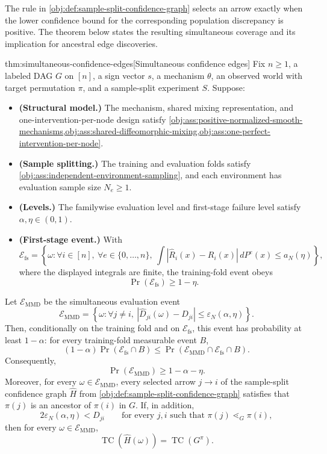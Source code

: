\documentclass[11pt]{article}
\begin{document}
The rule in \cref{obj:def:sample-split-confidence-graph} selects an arrow exactly when the lower confidence bound for the corresponding population discrepancy is positive. The theorem below states the resulting simultaneous coverage and its implication for ancestral edge discoveries.

\begin{theoremv}{thm:simultaneous-confidence-edges}[Simultaneous confidence edges]
Fix \(n\ge 1\), a labeled DAG \(G\) on \([n]\), a sign vector \(s\), a mechanism \(\theta\), an observed world with target permutation \(\pi\), and a sample-split experiment \(S\). Suppose:
\begin{itemize}
\item \textbf{(Structural model.)} The mechanism, shared mixing representation, and one-intervention-per-node design satisfy \cref{obj:ass:positive-normalized-smooth-mechanisms,obj:ass:shared-diffeomorphic-mixing,obj:ass:one-perfect-intervention-per-node}.
\item \textbf{(Sample splitting.)} The training and evaluation folds satisfy \cref{obj:ass:independent-environment-sampling}, and each environment has evaluation sample size \(N_e\ge 1\).
\item \textbf{(Levels.)} The familywise evaluation level and first-stage failure level satisfy \(\alpha,\eta\in(0,1)\).
\item \textbf{(First-stage event.)} With
\[
\mathcal E_{\mathrm{fs}}
=
\left\{
\omega:
\forall i\in[n],\ \forall e\in\{0,\ldots,n\},\
\int
\left|\widehat R_i(x)-R_i(x)\right|
\,dP^e(x)
\le a_N(\eta)
\right\},
\]
where the displayed integrals are finite, the training-fold event obeys
\[
\Pr(\mathcal E_{\mathrm{fs}})\ge 1-\eta .
\]
\end{itemize}
Let \(\mathcal E_{\mathrm{MMD}}\) be the simultaneous evaluation event
\[
\mathcal E_{\mathrm{MMD}}
=
\left\{
\omega:
\forall j\ne i,\
\left|\widehat D_{ji}(\omega)-D_{ji}\right|
\le \varepsilon_N(\alpha,\eta)
\right\}.
\]
Then, conditionally on the training fold and on \(\mathcal E_{\mathrm{fs}}\), this event has probability at least \(1-\alpha\): for every training-fold measurable event \(B\),
\[
(1-\alpha)\Pr(\mathcal E_{\mathrm{fs}}\cap B)
\le
\Pr(\mathcal E_{\mathrm{MMD}}\cap\mathcal E_{\mathrm{fs}}\cap B).
\]
Consequently,
\[
\Pr(\mathcal E_{\mathrm{MMD}})\ge 1-\alpha-\eta .
\]
Moreover, for every \(\omega\in\mathcal E_{\mathrm{MMD}}\), every selected arrow \(j\to i\) of the sample-split confidence graph \(\widehat H\) from \cref{obj:def:sample-split-confidence-graph} satisfies that \(\pi(j)\) is an ancestor of \(\pi(i)\) in \(G\). If, in addition,
\[
2\varepsilon_N(\alpha,\eta)<D_{ji}
\qquad
\text{for every }j,i\text{ such that }\pi(j)\lessdot_G \pi(i),
\]
then for every \(\omega\in\mathcal E_{\mathrm{MMD}}\),
\[
\operatorname{TC}\!\left(\widehat H(\omega)\right)
=
\operatorname{TC}\!\left(G^\pi\right).
\]
\end{theoremv}
\end{document}
